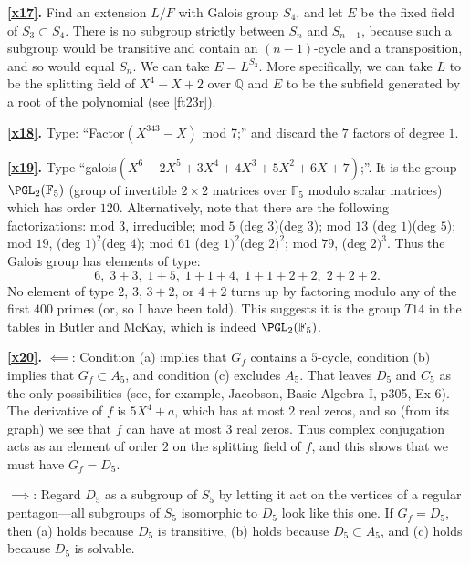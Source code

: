 \documentclass[a4paper,11pt,final,openany]{memoir}
\theoremstyle{nonumberplain}
\begin{document}
\medskip\noindent\textbf{\ref{x17}.} Find an extension $L/F$ with Galois group
$S_{4}$, and let $E$ be the fixed field of $S_{3}\subset S_{4}$. There is no
subgroup strictly between $S_{n}$ and $S_{n-1}$, because such a subgroup would
be transitive and contain an $(n-1)$-cycle and a transposition, and so would
equal $S_{n}$. We can take $E=L^{S_{3}}$. More specifically, we can take $L$
to be the splitting field of $X^{4}-X+2$ over $\mathbb{Q}{}$ and $E$ to be the
subfield generated by a root of the polynomial (see \ref{ft23r}).

\medskip\noindent\textbf{\ref{x18}.} Type: ``Factor$(X^{343}-X)$ mod 7;'' and
discard the $7$ factors of degree $1$.

\medskip\noindent\textbf{\ref{x19}.} Type \textquotedblleft galois$(X^{6}%
+2X^{5}+3X^{4}+4X^{3}+5X^{2}+6X+7)$;\textquotedblright. It is the group
$\PGL_{2}(\mathbb{F}_{5})$ (group of invertible $2\times2$ matrices over
$\mathbb{F}_{5}$ modulo scalar matrices) which has order $120$. Alternatively,
note that there are the following factorizations: mod $3$, irreducible; mod
$5$ (deg $3$)(deg $3$); mod $13$ (deg $1$)(deg $5$); mod $19 $, (deg $1)^{2}%
$(deg $4$); mod $61$ (deg $1)^{2}$(deg $2)^{2}$; mod $79$, (deg $2)^{3}$. Thus
the Galois group has elements of type:
\[
6, \; 3+3, \; 1+5, \; 1+1+4, \; 1+1+2+2, \; 2+2+2.
\]
No element of type $2$, $3$, $3+2$, or $4+2$ turns up by factoring modulo any
of the first $400$ primes (or, so I have been told). This suggests it is the
group $T14$ in the tables in Butler and McKay, which is indeed $\PGL_{2}%
(\mathbb{F}_{5})$.

\medskip\noindent\textbf{\ref{x20}.} $\impliedby$: Condition (a) implies that
$G_{f}$ contains a $5$-cycle, condition (b) implies that $G_{f}\subset A_{5}$,
and condition (c) excludes $A_{5}$. That leaves $D_{5}$ and $C_{5}$ as the
only possibilities (see, for example, Jacobson, Basic Algebra I, p305, Ex 6).
The derivative of $f$ is $5X^{4}+a$, which has at most $2$ real zeros, and so
(from its graph) we see that $f$ can have at most $3$ real zeros. Thus complex
conjugation acts as an element of order $2$ on the splitting field of $f$, and
this shows that we must have $G_{f}=D_{5}$.

\noindent$\implies$: Regard $D_{5}$ as a subgroup of $S_{5}$ by letting it act
on the vertices of a regular pentagon---all subgroups of $S_{5}$ isomorphic to
$D_{5}$ look like this one. If $G_{f}=D_{5}$, then (a) holds because $D_{5}$
is transitive, (b) holds because $D_{5}\subset A_{5}$, and (c) holds because
$D_{5}$ is solvable.
\end{document}
